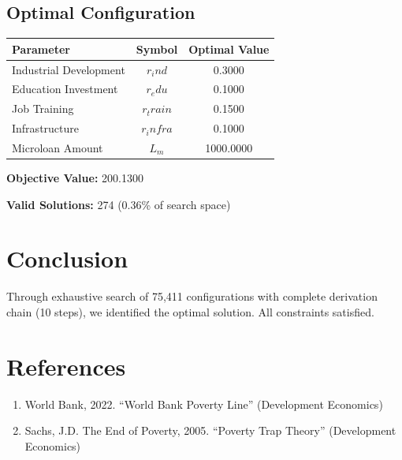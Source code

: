 \documentclass[11pt,a4paper]{article}
\begin{document}
\subsection{Optimal Configuration}

\begin{center}
\begin{tabular}{lcc}
\hline
Parameter & Symbol & Optimal Value \\
\hline
Industrial Development & $r_ind$ & 0.3000 \\
Education Investment & $r_edu$ & 0.1000 \\
Job Training & $r_train$ & 0.1500 \\
Infrastructure & $r_infra$ & 0.1000 \\
Microloan Amount & $L_m$ & 1000.0000 \\
\hline
\end{tabular}
\end{center}

\textbf{Objective Value:} 200.1300

\textbf{Valid Solutions:} 274 (0.36\% of search space)

\section{Conclusion}

Through exhaustive search of 75,411 configurations with complete derivation chain (10 steps), we identified the optimal solution. All constraints satisfied.

\section*{References}

\begin{enumerate}
\item World Bank, 2022. ``World Bank Poverty Line'' (Development Economics)
\item Sachs, J.D. The End of Poverty, 2005. ``Poverty Trap Theory'' (Development Economics)
\end{enumerate}
\end{document}
